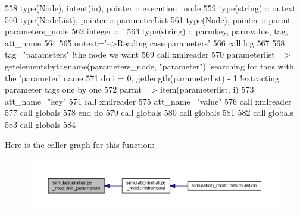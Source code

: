 \begin{DoxyCode}
558     \textcolor{keywordtype}{type}(Node), \textcolor{keywordtype}{intent(in)}, \textcolor{keywordtype}{pointer} :: execution\_node
559     \textcolor{keywordtype}{type}(string) :: outext
560     \textcolor{keywordtype}{type}(NodeList), \textcolor{keywordtype}{pointer} :: parameterList
561     \textcolor{keywordtype}{type}(Node), \textcolor{keywordtype}{pointer} :: parmt, parameters\_node
562     \textcolor{keywordtype}{integer} :: i
563     \textcolor{keywordtype}{type}(string) :: parmkey, parmvalue, tag, att\_name
564 
565     outext=\textcolor{stringliteral}{'-->Reading case parameters'}
566     \textcolor{keyword}{call }log%
567 
568     tag=\textcolor{stringliteral}{"parameters"}    \textcolor{comment}{!the node we want}
569     \textcolor{keyword}{call }xmlreader%
570     parameterlist => getelementsbytagname(parameters\_node, \textcolor{stringliteral}{"parameter"})       \textcolor{comment}{!searching for tags with the
       'parameter' name}
571     \textcolor{keywordflow}{do} i = 0, getlength(parameterlist) - 1                          \textcolor{comment}{!extracting parameter tags one by one}
572         parmt => item(parameterlist, i)
573         att\_name=\textcolor{stringliteral}{"key"}
574         \textcolor{keyword}{call }xmlreader%
575         att\_name=\textcolor{stringliteral}{"value"}
576         \textcolor{keyword}{call }xmlreader%
577         \textcolor{keyword}{call }globals%
578 \textcolor{keywordflow}{    end do}
579     \textcolor{keyword}{call }globals%
580     \textcolor{keyword}{call }globals%
581     
582     \textcolor{keyword}{call }globals%
583     \textcolor{keyword}{call }globals%
584 
\end{DoxyCode}
Here is the caller graph for this function\+:\nopagebreak
\begin{figure}[H]
\begin{center}
\leavevmode
\includegraphics[width=350pt]{namespacesimulationinitialize__mod_a0b32e8c950fc615198d1e47ba1d36cd6_icgraph}
\end{center}
\end{figure}
\mbox{\label{namespacesimulationinitialize__mod_a532cb4960e93dc27cff5dc2e04afe070}} 
